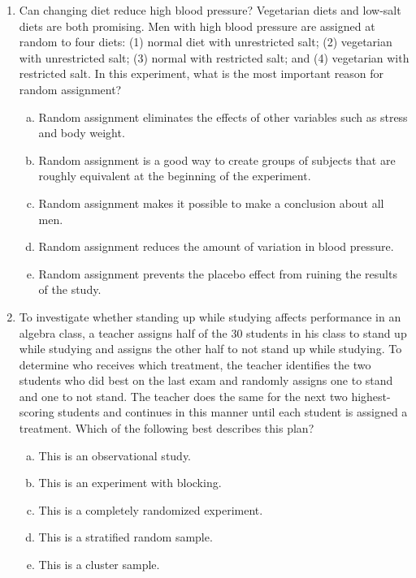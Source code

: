 \documentclass[a4paper,12pt,twoside]{book}
\begin{document}
\begin{enumerate}
  \item Can changing diet reduce high blood pressure? Vegetarian diets and low-salt diets are both promising. Men with high blood pressure are assigned at random to four diets: (1) normal diet with unrestricted salt; (2) vegetarian with unrestricted salt; (3) normal with restricted salt; and (4) vegetarian with restricted salt. In this experiment, what is the most important reason for random assignment?
  \begin{enumerate}[(a)]
      \item Random assignment eliminates the effects of other variables such as stress and body weight.
      \item Random assignment is a good way to create groups of subjects that are roughly equivalent at the beginning of the experiment. 
      \item Random assignment makes it possible to make a conclusion about all men.
      \item Random assignment reduces the amount of variation in blood pressure. 
      \item Random assignment prevents the placebo effect from ruining the results of the study.
  \end{enumerate}     
          
 \item To investigate whether standing up while studying affects performance in an algebra class, a teacher assigns half of the 30 students in his class to stand up while studying and assigns the other half to not stand up while studying. To determine who receives which treatment, the teacher identifies the two students who did best on the last exam and randomly assigns one to stand and one to not stand. The teacher does the same for the next two highest-scoring students and continues in this manner until each student is assigned a treatment. Which of the following best describes this plan?
     \begin{enumerate}[(a)]
         \item This is an observational study.
         \item This is an experiment with blocking.
         \item This is a completely randomized experiment.
         \item This is a stratified random sample.
         \item This is a cluster sample.
     \end{enumerate}
    

\end{enumerate}
\end{document}
